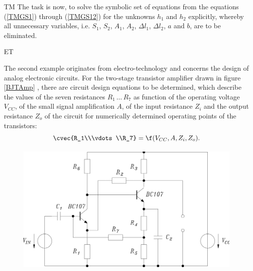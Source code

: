 \begin{example}{TM}
The task is now, to solve the symbolic set of equations from the equations  (\ref{TMGS1}) through (\ref{TMGS12}) for the unknowns $h_1$ and $h_2$ explicitly, whereby all unnecessary variables, i.e. $S_1$, $S_2$, $A_1$, $A_2$, $\Delta l_1$, $\Delta l_2$, $a$ and $b$, are to be eliminated.
\end{example}



\begin{example}{ET}

The second example originates from electro-technology and concerns the design of analog electronic circuits. For the two-stage transistor amplifier drawn in figure \ref{BJTAmp} \cite{Nuehrmann}, there are circuit design equations to be determined, which describe the values of the seven resistances 
$R_1 \, \ldots \, R_7$ as function of the operating voltage $V_{CC}$, of the small signal amplification $A$, of the input resistance $Z_i$ and the output resistance $Z_o$  of the circuit for numerically determined operating points of the transistors:
\begin{equation} \label{Rdim}
\cvec{R_1\\\vdots\\R_7} = \f( V_{CC}, A, Z_i, Z_o ).
\end{equation}


\begin {figure} [htbp]
\begin {center}
\includegraphics[height=6.4cm]{BJTAMP.png}
\caption {}%
\end {center}
\end {figure}



\end{example}
